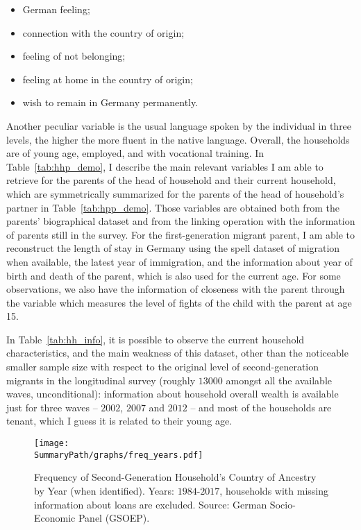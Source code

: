 \documentclass[12pt,a4paper]{article}
\newcommand*{\SummaryPath}{../../../res/summary}%
\begin{document}
\begin{itemize}
    \item German feeling;
    \item connection with the country of origin;
    \item feeling of not belonging;
    \item feeling at home in the country of origin;
    \item wish to remain in Germany permanently.
\end{itemize}

Another peculiar variable is the usual language spoken by the individual in three levels, the higher the more fluent in the native language. Overall, the households are of young age, employed, and with vocational training.
In Table~\ref{tab:hhp_demo}, I describe the main relevant variables I am able to retrieve for the parents of the head of household and their current household, which are symmetrically summarized for the parents of the head of household's partner in Table~\ref{tab:hpp_demo}. Those variables are obtained both from the parents' biographical dataset and from the linking operation with the information of parents still in the survey. For the first-generation migrant parent, I am able to reconstruct the length of stay in Germany using the spell dataset of migration when available, the latest year of immigration, and the information about year of birth and death of the parent, which is also used for the current age. For some observations, we also have the information of closeness with the parent through the variable which measures the level of fights of the child with the parent at age 15.

In Table~\ref{tab:hh_info}, it is possible to observe the current household characteristics, and the main weakness of this dataset, other than the noticeable smaller sample size with respect to the original level of second-generation migrants in the longitudinal survey (roughly $13000$ amongst all the available waves, unconditional): information about household overall wealth is available just for three waves -- $2002$, $2007$ and $2012$ -- and most of the households are tenant, which I guess it is related to their young age. 

\begin{figure}[htbp!]
    \centering
    \texttt{[image: \\SummaryPath/graphs/freq\_years.pdf]}
    \caption{Frequency of Second-Generation Household's Country of Ancestry by Year (when identified). Years: $1984$-$2017$, households with missing information about loans are excluded. Source: German Socio-Economic Panel (GSOEP).}\label{fig:bar_2ndgen_year}
\end{figure}
\end{document}
